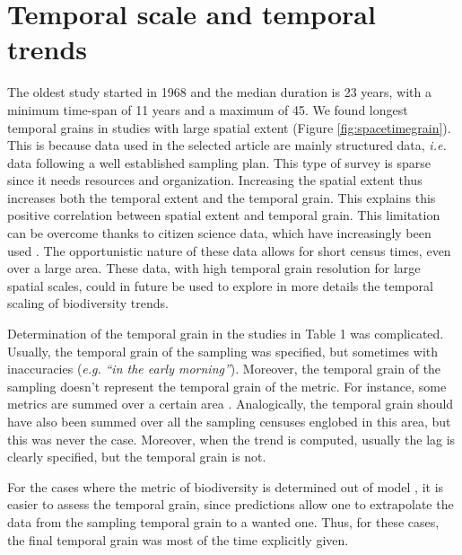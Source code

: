 \documentclass[
  12pt,
  oneside]{report}
\begin{document}
\hypertarget{temporal-scale-and-temporal-trends}{%
\chapter{Temporal scale and temporal trends}\label{temporal-scale-and-temporal-trends}}

The oldest study started in 1968 and the median duration is 23 years, with a minimum time-span of 11 years and a maximum of 45. We found longest temporal grains in studies with large spatial extent (Figure \ref{fig:spacetimegrain}). This is because data used in the selected article are mainly structured data, \emph{i.e.} data following a well established sampling plan. This type of survey is sparse since it needs resources and organization. Increasing the spatial extent thus increases both the temporal extent and the temporal grain. This explains this positive correlation between spatial extent and temporal grain. This limitation can be overcome thanks to citizen science data, which have increasingly been used \autocites[\emph{e.g.}][]{bowler_geographic_2021,isaac_data_2020,isaac_statistics_2014}. The opportunistic nature of these data allows for short census times, even over a large area. These data, with high temporal grain resolution for large spatial scales, could in future be used to explore in more details the temporal scaling of biodiversity trends.

Determination of the temporal grain in the studies in Table 1 was complicated. Usually, the temporal grain of the sampling was specified, but sometimes with inaccuracies (\emph{e.g.} \emph{``in the early morning''}). Moreover, the temporal grain of the sampling doesn't represent the temporal grain of the metric. For instance, some metrics are summed over a certain area \autocite[\emph{e.g.} summing the species richness over an atlas square, such as in][]{van_turnhout_scale-dependent_2007}. Analogically, the temporal grain should have also been summed over all the sampling censuses englobed in this area, but this was never the case. Moreover, when the trend is computed, usually the lag \autocite[\emph{i.e.} the time between two computation of the metric,][]{dungan_balanced_2002} is clearly specified, but the temporal grain is not.

For the cases where the metric of biodiversity is determined out of model \autocite[\emph{e.g.}][]{harrison_assessing_2014}, it is easier to assess the temporal grain, since predictions allow one to extrapolate the data from the sampling temporal grain to a wanted one. Thus, for these cases, the final temporal grain was most of the time explicitly given.
\end{document}
